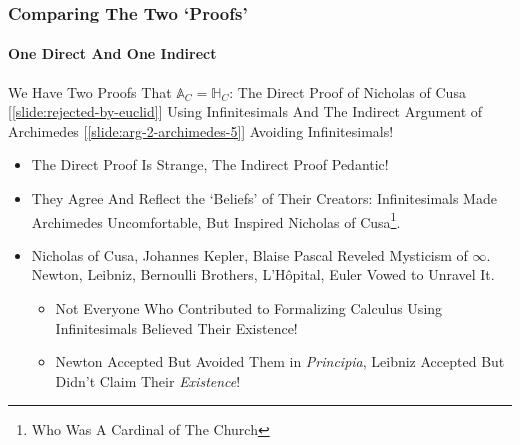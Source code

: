 \begin{frame}
\frametitle{Comparing The Two `Proofs'}
\framesubtitle{One Direct And One Indirect}
\label{slide:comparison-of-proofs}
We Have Two Proofs That $\mathbb{A}_C=\mathbb{H}_C$: The \alert{Direct Proof of Nicholas of Cusa [\ref{slide:rejected-by-euclid}] Using Infinitesimals} And The \alert{Indirect Argument of Archimedes [\ref{slide:arg-2-archimedes-5}] Avoiding Infinitesimals}!
\begin{itemize}
\pause
\item The \alert{Direct Proof Is Strange}, The \alert {Indirect Proof Pedantic}!
\pause
\item They Agree And Reflect the `Beliefs' of Their Creators: Infinitesimals Made Archimedes Uncomfortable, But Inspired Nicholas of Cusa\footnote{Who Was A Cardinal of The Church}.
\pause
\item Nicholas of Cusa, Johannes Kepler, Blaise Pascal Reveled Mysticism of \alert{$\infty$}. Newton, Leibniz, Bernoulli Brothers, L'H\^{o}pital, Euler Vowed to Unravel It.
\begin{itemize}
\pause
\item Not Everyone Who Contributed to Formalizing Calculus Using Infinitesimals Believed Their Existence!
\pause
\item Newton Accepted \alert{But Avoided Them in \textit{Principia}}, Leibniz Accepted \alert{But Didn't Claim Their \textit{Existence}}!
\end{itemize}
\end{itemize}
\end{frame}
